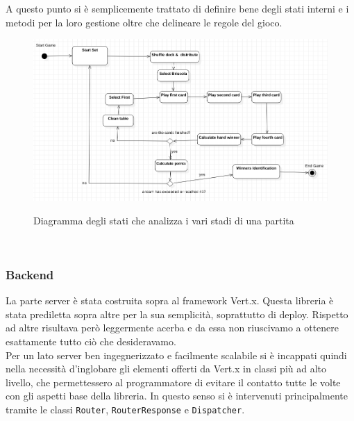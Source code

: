 	  A questo punto si è semplicemente trattato di definire bene degli stati interni e i metodi per la loro gestione oltre che delineare le regole del gioco.
            \begin{figure}[!h]
                \includegraphics[scale=0.5]{images/MatchStateChar.png}
                \label{fig:MatchStateChar}
                \caption{Diagramma degli stati che analizza i vari stadi di una partita}
            \end{figure}
	  \\
	  \subsubsection{Backend}
	  La parte server è stata costruita sopra al framework Vert.x. Questa libreria è stata prediletta sopra altre per la sua semplicità, soprattutto di deploy. Rispetto ad altre risultava però leggermente acerba e da essa non riuscivamo a ottenere esattamente tutto ciò che desideravamo.
	  \\
	  Per un lato server ben ingegnerizzato e facilmente scalabile si è incappati quindi nella necessità d'inglobare gli elementi offerti da Vert.x in classi più ad alto livello, che permettessero al programmatore di evitare il contatto tutte le volte con gli aspetti base della libreria.
	  In questo senso si è intervenuti principalmente tramite le classi \texttt{Router}, \texttt{RouterResponse} e \texttt{Dispatcher}.

